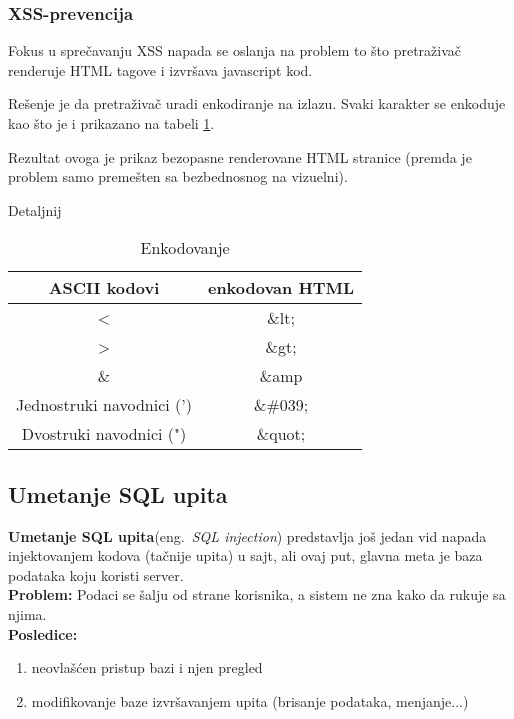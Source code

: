 \documentclass[a4paper]{article}
\begin{document}
\subsubsection{XSS-prevencija}

Fokus u sprečavanju XSS\cite{XSS_prev} napada se oslanja na problem to što pretraživač renderuje HTML tagove i izvršava javascript kod.  

Rešenje je da pretraživač uradi enkodiranje na izlazu. Svaki karakter se enkoduje kao što je i prikazano na tabeli \ref{kodiranje}.

Rezultat ovoga je prikaz bezopasne renderovane HTML stranice (premda je problem samo premešten sa bezbednosnog na vizuelni).

Detaljnij

\begin{table}[ht]

\begin{center}
\caption{Enkodovanje}
\begin{tabular}{ | c | c | }
\hline
	\rowcolor{yellow}
\textbf{ASCII kodovi} & \textbf{enkodovan HTML} \\
	\hline
 < & \&lt; \\ 
 \hline
 > & \&gt; \\  
 \hline
 \& & \&amp \\
 \hline
 Jednostruki navodnici (') & \&\#039;\\
 \hline
 Dvostruki navodnici (") & \&quot;\\  
 \hline  
\end{tabular}

\label{kodiranje}
\end{center}
\end{table}

\subsection{Umetanje SQL upita}

\textbf{Umetanje SQL upita}(eng.~{\em SQL injection})\cite{SQL} predstavlja još jedan vid napada injektovanjem kodova (tačnije upita) u sajt, ali ovaj put, glavna meta je baza podataka koju koristi server.\\
\textbf{Problem:} Podaci se šalju od strane korisnika, a sistem ne zna kako da rukuje sa njima.\\
\textbf{Posledice:} 
\begin{enumerate}
	\item neovlašćen pristup bazi i njen pregled
	\item modifikovanje baze izvršavanjem upita (brisanje podataka, menjanje...)
\end{enumerate}
\end{document}
